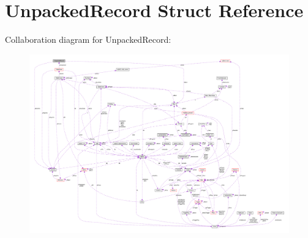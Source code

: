 \hypertarget{structUnpackedRecord}{}\section{Unpacked\+Record Struct Reference}
\label{structUnpackedRecord}


Collaboration diagram for Unpacked\+Record\+:\nopagebreak
\begin{figure}[H]
\begin{center}
\leavevmode
\includegraphics[width=350pt]{structUnpackedRecord__coll__graph}
\end{center}
\end{figure}
